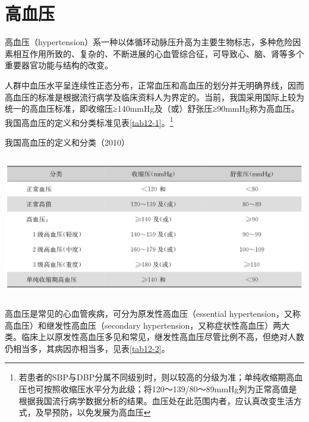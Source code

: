 \chapter{高血压}

高血压（hypertension）系一种以体循环动脉压升高为主要生物标志，多种危险因素相互作用所致的、复杂的、不断进展的心血管综合征，可导致心、脑、肾等多个重要器官功能与结构的改变。

人群中血压水平呈连续性正态分布，正常血压和高血压的划分并无明确界线，因而高血压的标准是根据流行病学及临床资料人为界定的。当前，我国采用国际上较为统一的高血压标准，即收缩压≥140mmHg及（或）舒张压≥90mmHg称为高血压。我国高血压的定义和分类标准见表\ref{tab12-1}。\footnote{若患者的SBP与DBP分属不同级别时，则以较高的分级为准；单纯收缩期高血压也可按照收缩压水平分为此级；将120～139/80～89mmHg列为正常高值是根据我国流行病学数据分析的结果。血压处在此范围内者，应认真改变生活方式，及早预防，以免发展为高血压}

\begin{table}[htbp]
\centering
\caption{我国高血压的定义和分类（2010）}
\label{tab12-1}
\includegraphics[width=5.91667in,height=2.45833in]{./images/Image00082.jpg}
\end{table}



高血压是常见的心血管疾病，可分为原发性高血压（essential
hypertension，又称高血压）和继发性高血压（secondary
hypertension，又称症状性高血压）两大类。临床上以原发性高血压多见和常见，继发性高血压尽管比例不高，但绝对人数仍相当多，其病因亦相当多，见表\ref{tab12-2}。

